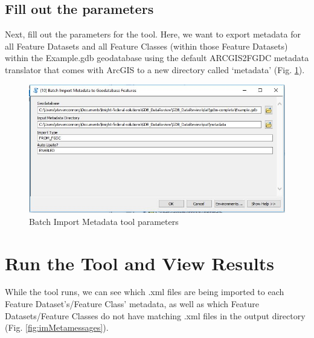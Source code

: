 \documentclass[openany]{book}
\theoremstyle{definition}
\theoremstyle{definition}
\theoremstyle{definition}
\theoremstyle{remark}
\begin{document}
\subsection{Fill out the parameters}\label{fill-out-the-parameters-11}

Next, fill out the parameters for the tool. Here, we want to export
metadata for all Feature Datasets and all Feature Classes (within those
Feature Datasets) within the Example.gdb geodatabase using the default
ARCGIS2FGDC metadata translator that comes with ArcGIS to a new
directory called `metadata' (Fig. \ref{fig:imMetaparams}).

\begin{figure}[H]

{\centering \includegraphics{figures/imMeta-params} 

}

\caption{Batch Import Metadata tool parameters}\label{fig:imMetaparams}
\end{figure}

\section{Run the Tool and View
Results}\label{run-the-tool-and-view-results-11}

While the tool runs, we can see which .xml files are being imported to
each Feature Dataset's/Feature Class' metadata, as well as which Feature
Datasets/Feature Classes do not have matching .xml files in the output
directory (Fig. \ref{fig:imMetamessages}).
\end{document}
